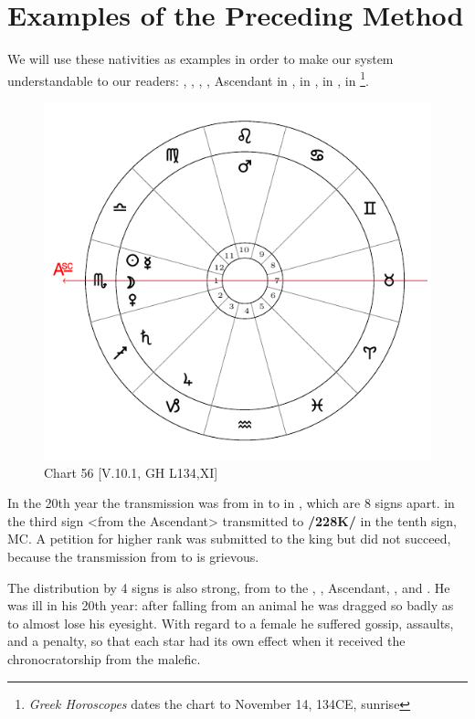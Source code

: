 \section{Examples of the Preceding Method}

We will use these nativities as examples in order to make our system understandable to our readers: \Sun, \Moon, \Venus, \Mercury, Ascendant in \Scorpio, \Saturn\xspace in \Sagittarius, \Jupiter\xspace in \Capricorn, \Mars\xspace in \Leo\footnote{\textit{Greek Horoscopes} dates the chart to November 14, 134CE, sunrise}. 

\begin{figure}
\centering
\vspace{-20pt}
\includegraphics[width=.68\textwidth]{charts/5_10_01}
\caption{Chart 56 [V.10.1, GH L134,XI]}
\label{fig:chart56}
\end{figure}

In the 20th year the transmission was from \Jupiter\xspace in \Capricorn\xspace to \Mars\xspace in \Leo, which are 8 signs
apart. \Jupiter\xspace in the third sign <from the Ascendant> transmitted to \Mars\xspace \textbf{/228K/} in the tenth sign, MC.
A petition for higher rank was submitted to the king but did not succeed, because the transmission from \Jupiter\xspace to \Mars\xspace is grievous. 

The distribution by 4 signs is also strong, from \Mars\xspace to the \Sun, \Moon, Ascendant, \Mercury, and \Venus. He was ill in his 20th year: after falling from an animal he was dragged so badly as to almost lose his eyesight. With regard to a female he suffered gossip, assaults, and a penalty, so that each star had its own effect when it received the chronocratorship from the malefic. 

